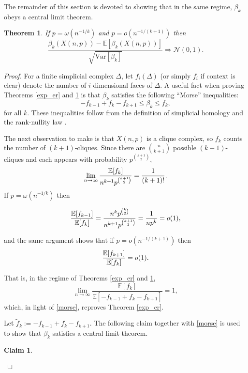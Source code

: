 \documentclass{amsart}
\newtheorem{theorem}[thm]{Theorem}
\theoremstyle{definition}
\newtheorem{claim}[thm]{Claim}
\newcommand{\E}{\mathbb{E}}
\newcommand{\var}{\mathrm{Var}}
\renewcommand{\1}{\mathbb{1}}
\begin{document}
The remainder of this section is
devoted to showing that in the
same regime, $\beta_k$ obeys a central limit theorem.

\begin{theorem} \label{clt_er} 
If $p = \omega(n^{-1/k})$ and $p=o( n^{-1/(k+1)})$ then $$ \frac{
  \beta_k (X(n,p)) - \E[\beta_k(X(n,p))] }{ \sqrt{\var [ \beta_k]}} \Rightarrow
\mathcal{N}(0,1).$$
\end{theorem}

\begin{proof}
For a finite simplicial complex $\Delta$, let $f_i(\Delta)$ (or simply
$f_i$ if context is clear) denote the number of
$i$-dimensional faces of $\Delta$.  A useful fact when proving
Theorems \ref{exp_er} and \ref{clt_er} is that 
$\beta_k$ satisfies the following ``Morse''
inequalities:
\begin{equation}\label{morse}
-f_{k-1}+f_k-f_{k+1} \le \beta_k \le f_k,
\end{equation}
 for all $k$.  These
inequalities follow from the definition of simplicial homology and the
rank-nullity law \cite{Hatcher}.

The next observation to make is that $X(n,p)$ is a clique complex, 
so $f_k$ counts the number of $(k+1)$-cliques.
Since there are $\binom{n}{k+1}$ possible $(k+1)$-cliques and each appears with
probability $p^{k+1 \choose 2}$,
$$ \lim_{n \to \infty} {\E[f_k] \over n^{k+1} p^{k+1 \choose 2}} = \frac{1}{
(k+1)!}.$$
If $p = \omega(n^{-1/k})$ then

$${\E[f_{k-1}] \over \E[f_k]}  ={ n^k p^{k \choose 2} \over n^{k+1}
  p^{k+1 \choose 2}}= {1 \over n p^k}= o(1),$$

and the same argument shows that if $p =
o(n^{-1/(k+1)})$ then $${\E[f_{k +1 }] \over \E[
    f_{k} ]} = o(1).$$

That is, in the regime of Theorems \ref{exp_er} and \ref{clt_er}, 
$$\lim_{n\to\infty}\frac{\E[f_k]}{\E[-f_{k-1}+f_k-f_{k+1}]}=1,$$
which, in light of \eqref{morse}, reproves Theorem \ref{exp_er}.

Let $\tilde{f}_k:=-f_{k-1}+f_k-f_{k+1}.$ 
The following claim together with \eqref{morse} is used 
to show that $\beta_k$ satisfies a central limit
theorem.
\begin{claim}

\

\begin{enumerate}


\end{enumerate}
\end{claim}
\end{proof}
\end{document}
